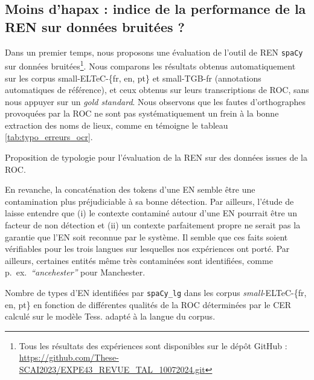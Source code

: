 \subsection{Moins d'hapax : indice de la performance de la REN sur données bruitées ?}
\label{subsec:eval_manu_OCR-IMPACT-NER}
Dans un premier temps, nous proposons une évaluation de l'outil de REN \texttt{spaCy} sur données bruitées\footnote{Tous les résultats des expériences sont disponibles sur le dépôt GitHub : \url{https://github.com/These-SCAI2023/EXPE43_REVUE_TAL_10072024.git}}. Nous comparons les résultats obtenus automatiquement sur les corpus small-ELTeC-\{fr, en, pt\} et small-TGB-fr (annotations automatiques de référence), et ceux obtenus sur leurs transcriptions de ROC, sans nous appuyer sur un \textit{gold standard}. Nous observons que les fautes d'orthographes provoquées par la ROC ne sont pas systématiquement un frein à la bonne extraction des noms de lieux, comme en témoigne le tableau \ref{tab:typo_erreurs_ocr}.
\begin{table}[h!]
\small
    \centering
   
    \caption{Proposition de typologie pour l'évaluation de la REN sur des données issues de la ROC.}
    \label{tab:typo_erreurs_ocr}
\end{table}

En revanche, la concaténation des tokens d'une EN semble être une contamination plus préjudiciable à sa bonne détection. Par ailleurs, l'étude de  laisse entendre que (i) le contexte contaminé autour d'une EN pourrait être un facteur de non détection et (ii) un contexte parfaitement propre ne serait pas la garantie que l'EN soit reconnue par le système. Il semble que ces faits soient vérifiables pour les trois langues sur lesquelles nos expériences ont porté. Par ailleurs, certaines entités même très contaminées sont identifiées, comme p.\ ex.\  \textit{``ancehester''} pour \og{}Manchester\fg{}. 


\begin{table}[h!]
    \centering
    \small
    
    \caption{Nombre de types d'EN identifiées par \texttt{spaCy\_lg} dans les corpus \textit{small}-ELTeC-\{fr, en, pt\}  en fonction de différentes qualités de la ROC déterminées par le CER calculé sur le modèle Tess. adapté à la langue du corpus. 
    }
    \label{tab:ELTeC_bon_mauvais}
\end{table}

